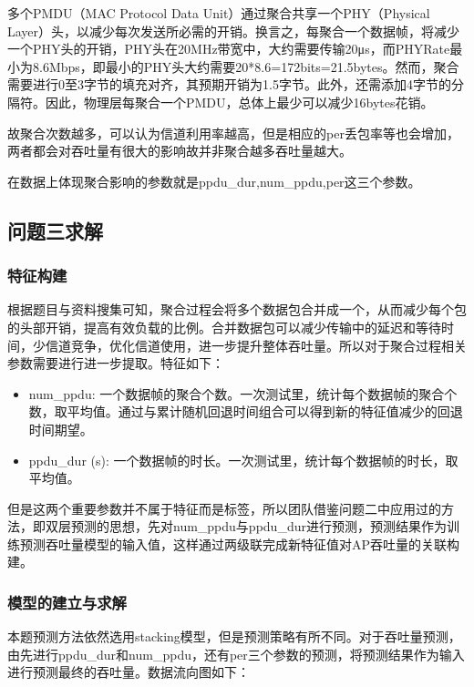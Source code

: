 \documentclass[bwprint]{gmcmthesis}
\begin{document}
多个PMDU（MAC Protocol Data Unit）通过聚合共享一个PHY（Physical Layer）头，以减少每次发送所必需的开销。换言之，每聚合一个数据帧，将减少一个PHY头的开销，PHY头在20MHz带宽中，大约需要传输20μs，而PHYRate最小为8.6Mbps，即最小的PHY头大约需要20*8.6=172bits=21.5bytes。然而，聚合需要进行0至3字节的填充对齐，其预期开销为1.5字节。此外，还需添加4字节的分隔符。因此，物理层每聚合一个PMDU，总体上最少可以减少16bytes花销。

故聚合次数越多，可以认为信道利用率越高，但是相应的per丢包率等也会增加，两者都会对吞吐量有很大的影响故并非聚合越多吞吐量越大。

在数据上体现聚合影响的参数就是ppdu\_dur,num\_ppdu,per这三个参数。

\subsection{问题三求解}
\subsubsection{特征构建}

根据题目与资料搜集可知，聚合过程会将多个数据包合并成一个，从而减少每个包的头部开销，提高有效负载的比例。合并数据包可以减少传输中的延迟和等待时间，少信道竞争，优化信道使用，进一步提升整体吞吐量。所以对于聚合过程相关参数需要进行进一步提取。特征如下：

\begin{itemize}
	\item num\_ppdu: 一个数据帧的聚合个数。一次测试里，统计每个数据帧的聚合个数，取平均值。通过与累计随机回退时间组合可以得到新的特征值减少的回退时间期望。
	\item ppdu\_dur (s): 一个数据帧的时长。一次测试里，统计每个数据帧的时长，取平均值。
\end{itemize}

但是这两个重要参数并不属于特征而是标签，所以团队借鉴问题二中应用过的方法，即双层预测的思想，先对num\_ppdu与ppdu\_dur进行预测，预测结果作为训练预测吞吐量模型的输入值，这样通过两级联完成新特征值对AP吞吐量的关联构建。

\subsubsection{模型的建立与求解}


本题预测方法依然选用stacking模型，但是预测策略有所不同。对于吞吐量预测，由先进行ppdu\_dur和num\_ppdu，还有per三个参数的预测，将预测结果作为输入进行预测最终的吞吐量。数据流向图如下：
\end{document}
